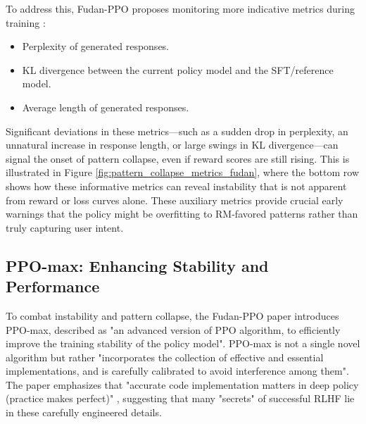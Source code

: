 \documentclass[10pt,journal,compsoc]{IEEEtran} %
\begin{document}
To address this, Fudan-PPO proposes monitoring more indicative metrics during training \cite{Zheng2023PPO}:
\begin{itemize}
    \item Perplexity of generated responses.
    \item KL divergence between the current policy model and the SFT/reference model.
    \item Average length of generated responses.
\end{itemize}
Significant deviations in these metrics—such as a sudden drop in perplexity, an unnatural increase in response length, or large swings in KL divergence—can signal the onset of pattern collapse, even if reward scores are still rising. This is illustrated in Figure \ref{fig:pattern_collapse_metrics_fudan}, where the bottom row shows how these informative metrics can reveal instability that is not apparent from reward or loss curves alone. These auxiliary metrics provide crucial early warnings that the policy might be overfitting to RM-favored patterns rather than truly capturing user intent.


\subsection{PPO-max: Enhancing Stability and Performance}
To combat instability and pattern collapse, the Fudan-PPO paper introduces PPO-max, described as "an advanced version of PPO algorithm, to efficiently improve the training stability of the policy model". \cite{Zheng2023PPO} PPO-max is not a single novel algorithm but rather "incorporates the collection of effective and essential implementations, and is carefully calibrated to avoid interference among them". \cite{Zheng2023PPO} The paper emphasizes that "accurate code implementation matters in deep policy (practice makes perfect)" \cite{Zheng2023PPO}, suggesting that many "secrets" of successful RLHF lie in these carefully engineered details.
\end{document}
